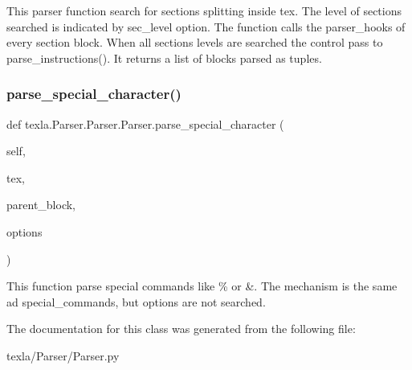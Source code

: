\begin{DoxyVerb}This parser function search for sections splitting inside tex.
The level of sections searched is indicated by sec_level option.
The function calls the parser_hooks of every section block.
When all sections levels are searched the control
pass to parse_instructions().
It returns a list of blocks parsed as tuples.
\end{DoxyVerb}
 \hypertarget{classtexla_1_1Parser_1_1Parser_1_1Parser_af4a46e7760e444cd77edf24053eb2cad}{}\label{classtexla_1_1Parser_1_1Parser_1_1Parser_af4a46e7760e444cd77edf24053eb2cad} 
\subsubsection{\texorpdfstring{parse\+\_\+special\+\_\+character()}{parse\_special\_character()}}
{\footnotesize\ttfamily def texla.\+Parser.\+Parser.\+Parser.\+parse\+\_\+special\+\_\+character (\begin{DoxyParamCaption}\item[{}]{self,  }\item[{}]{tex,  }\item[{}]{parent\+\_\+block,  }\item[{}]{options }\end{DoxyParamCaption})}

\begin{DoxyVerb}This function parse special commands like \% or \&.
The mechanism is the same ad special_commands, but options
are not searched.
\end{DoxyVerb}
 

The documentation for this class was generated from the following file\+:\begin{DoxyCompactItemize}
\item 
texla/\+Parser/Parser.\+py\end{DoxyCompactItemize}
